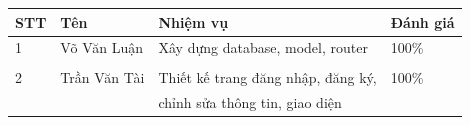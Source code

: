 \documentclass[a4paper]{article}
\begin{document}
    \begin{center}
        \begin{table}[h]
            \begin{tabular}{|l|l|l|l|}
            \hline
            STT & Tên & Nhiệm vụ & Đánh giá\\
            \hline
            1 & Võ Văn Luận & Xây dựng database, model, router & 100\%\\
              & &         & \\
            \hline
            2 & Trần Văn Tài & Thiết kế trang đăng nhập, đăng ký, & 100\%\\
              & & chỉnh sửa thông tin, giao diện &\\
            \hline
            \end{tabular}
        \end{table}    
    \end{center}

\listoffigures
\newpage
\end{document}
